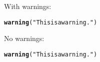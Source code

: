 \documentclass{article}\usepackage[]{graphicx}\usepackage[]{color}
\makeatletter
\newcommand{\hlstr}[1]{\textcolor[rgb]{0.192,0.494,0.8}{#1}}%
\newcommand{\hlstd}[1]{\textcolor[rgb]{0.345,0.345,0.345}{#1}}%
\newcommand{\hlkwd}[1]{\textcolor[rgb]{0.737,0.353,0.396}{\textbf{#1}}}%
\newenvironment{kframe}{%
 \def\at@end@of@kframe{}%
 \ifinner\ifhmode%
  \def\at@end@of@kframe{\end{minipage}}%
  \begin{minipage}{\columnwidth}%
 \fi\fi%
 \def\FrameCommand##1{\hskip\@totalleftmargin \hskip-\fboxsep
 \colorbox{shadecolor}{##1}\hskip-\fboxsep
     \hskip-\linewidth \hskip-\@totalleftmargin \hskip\columnwidth}%
 \MakeFramed {\advance\hsize-\width
   \@totalleftmargin\z@ \linewidth\hsize
   \@setminipage}}%
 {\par\unskip\endMakeFramed%
 \at@end@of@kframe}
\newenvironment{knitrout}{}{} %
\makeatother
\begin{document}
With warnings:

\begin{knitrout}
\color{fgcolor}\begin{kframe}
\begin{alltt}
\hlkwd{warning}\hlstd{(}\hlstr{"This is a warning."}\hlstd{)}
\end{alltt}


{\ttfamily\noindent\color{warningcolor}{\#\# Warning: This is a warning.}}\end{kframe}
\end{knitrout}

No warnings:

\begin{knitrout}
\color{fgcolor}\begin{kframe}
\begin{alltt}
\hlkwd{warning}\hlstd{(}\hlstr{"This is a warning."}\hlstd{)}
\end{alltt}
\end{kframe}
\end{knitrout}
\end{document}
